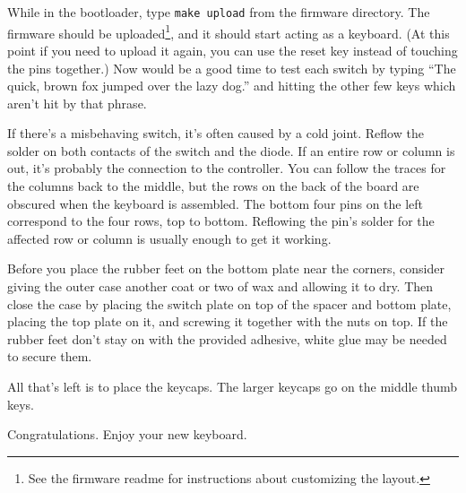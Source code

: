 \documentclass{article}
\begin{document}
\vspace{1em}

While in the bootloader, type \texttt{make upload} from the firmware
directory. The firmware should be uploaded\footnote{See the firmware
  readme for instructions about customizing the layout.}, and it
should start acting as a keyboard. (At this point if you need to
upload it again, you can use the reset key instead of touching the
pins together.) Now would be a good time to test each switch by typing
``The quick, brown fox jumped over the lazy dog.'' and hitting the
other few keys which aren't hit by that phrase.

\vspace{1em}

If there's a misbehaving switch, it's often caused by a cold
joint. Reflow the solder on both contacts of the switch and the
diode. If an entire row or column is out, it's probably the connection
to the controller. You can follow the traces for the columns back
to the middle, but the rows on the back of the board are obscured when
the keyboard is assembled. The bottom four pins on the left correspond
to the four rows, top to bottom. Reflowing the pin's solder for the
affected row or column is usually enough to get it working.

\vspace{1em}

Before you place the rubber feet on the bottom plate near the corners,
consider giving the outer case another coat or two of wax and allowing
it to dry. Then close the case by placing the switch plate on top of
the spacer and bottom plate, placing the top plate on it, and screwing
it together with the nuts on top. If the rubber feet don't stay on
with the provided adhesive, white glue may be needed to secure them.

\vspace{1em}

All that's left is to place the keycaps. The larger keycaps go on the
middle thumb keys.

\vspace{1em}

Congratulations. Enjoy your new keyboard.

\end{document}
